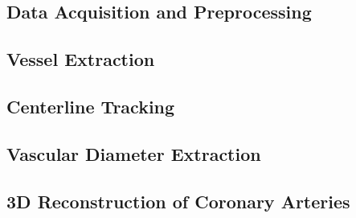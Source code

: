 \subsection{Data Acquisition and Preprocessing}




\subsection{Vessel Extraction}


\subsection{Centerline Tracking}


\subsection{Vascular Diameter Extraction}


\subsection{3D Reconstruction of Coronary Arteries}

